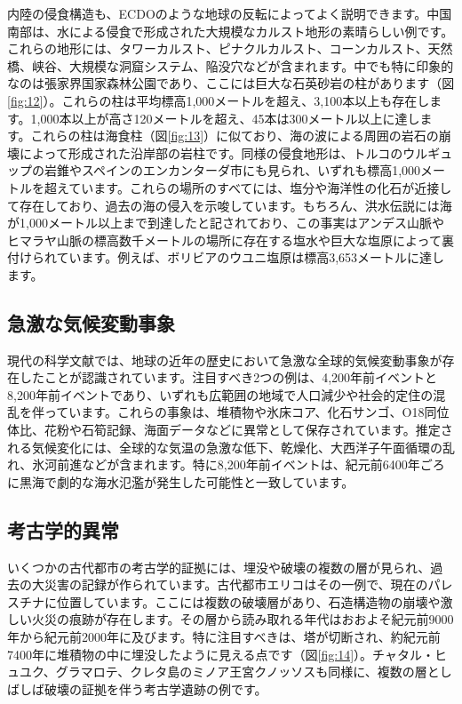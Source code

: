 \documentclass[10pt,twocolumn,letterpaper]{article}
\begin{document}
内陸の侵食構造も、ECDOのような地球の反転によってよく説明できます。中国南部は、水による侵食で形成された大規模なカルスト地形の素晴らしい例です\cite{82}。これらの地形には、タワーカルスト、ピナクルカルスト、コーンカルスト、天然橋、峡谷、大規模な洞窟システム、陥没穴などが含まれます。中でも特に印象的なのは張家界国家森林公園であり、ここには巨大な石英砂岩の柱があります（図\ref{fig:12}）\cite{84}。これらの柱は平均標高1,000メートルを超え、3,100本以上も存在します。1,000本以上が高さ120メートルを超え、45本は300メートル以上に達します\cite{85}。これらの柱は海食柱（図\ref{fig:13}）に似ており、海の波による周囲の岩石の崩壊によって形成された沿岸部の岩柱です。同様の侵食地形は、トルコのウルギュップの岩錐やスペインのエンカンターダ市にも見られ、いずれも標高1,000メートルを超えています。これらの場所のすべてには、塩分や海洋性の化石が近接して存在しており、過去の海の侵入を示唆しています\cite{15,86,87}。もちろん、洪水伝説\cite{3}には海が1,000メートル以上まで到達したと記されており、この事実はアンデス山脈やヒマラヤ山脈の標高数千メートルの場所に存在する塩水や巨大な塩原によって裏付けられています。例えば、ボリビアのウユニ塩原は標高3,653メートルに達します\cite{94}。

\subsection{急激な気候変動事象}

現代の科学文献では、地球の近年の歴史において急激な全球的気候変動事象が存在したことが認識されています。注目すべき2つの例は、4,200年前イベントと8,200年前イベントであり、いずれも広範囲の地域で人口減少や社会的定住の混乱を伴っています。これらの事象は、堆積物や氷床コア、化石サンゴ、O18同位体比、花粉や石筍記録、海面データなどに異常として保存されています。推定される気候変化には、全球的な気温の急激な低下、乾燥化、大西洋子午面循環の乱れ、氷河前進などが含まれます\cite{90,91,92}。特に8,200年前イベントは、紀元前6400年ごろに黒海で劇的な海水氾濫が発生した可能性と一致しています\cite{93}。

\subsection{考古学的異常}

いくつかの古代都市の考古学的証拠には、埋没や破壊の複数の層が見られ、過去の大災害の記録が作られています。古代都市エリコはその一例で、現在のパレスチナに位置しています。ここには複数の破壊層があり、石造構造物の崩壊や激しい火災の痕跡が存在します\cite{96,97}。その層から読み取れる年代はおおよそ紀元前9000年から紀元前2000年に及びます。特に注目すべきは、塔が切断され、約紀元前7400年に堆積物の中に埋没したように見える点です（図\ref{fig:14}）\cite{95}。チャタル・ヒュユク\cite{99}、グラマロテ\cite{98}、クレタ島のミノア王宮クノッソス\cite{100,101}も同様に、複数の層としばしば破壊の証拠を伴う考古学遺跡の例です。
\end{document}
